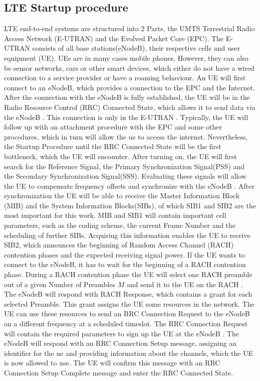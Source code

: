 \documentclass[conference]{IEEEtran}
\begin{document}
\subsection{LTE Startup procedure}
LTE end-to-end systems are structured into 2 Parts, the UMTS Terrestrial Radio Access Network (E-UTRAN) and the Evolved Packet Core (EPC).
The E-UTRAN consists of all base stations(eNodeB), their respective cells and user equipment (UE).
UEs are in many cases mobile phones.
However, they can also be sensor networks, cars or other smart devices, which either do not have a wired connection to a service provider or have a roaming behaviour.
An UE will first connect to an eNodeB, which provides a connection to the EPC and the Internet.
After the connection with the eNodeB is fully established, the UE will be in the Radio Resource Control (RRC) Connected State, which allows it to send data via the eNodeB .
This connection is only in the E-UTRAN .
Typically, the UE will follow up with an attachment procedure with the EPC and some other procedures, which in turn will allow the ue to access the internet.
Nevertheless, the Startup Procedure until the RRC Connected State will be the first bottleneck, which the UE will encounter.
After turning on, the UE will first search for the Reference Signal, the Primary Synchronization Signal(PSS) and the Secondary Synchronization Signal(SSS).
Evaluating these signals will allow the UE to compensate frequency offsets and synchronize with the eNodeB .
After synchronization the UE will be able to receive the Master Information Block (MIB) and the System Information Blocks(SIBs), of which SIB1 and SIB2 are the most important for this work.
MIB and SIB1 will contain important cell parameters, such as the coding scheme, the current Frame Number and the scheduling of further SIBs.
Acquiring this information enables the UE to receive SIB2, which announces the beginning of Random Access Channel (RACH) contention phases and the expected receiving signal power.
If the UE wants to connect to the eNodeB, it has to wait for the beginning of a RACH contention phase.
During a RACH contention phase the UE will select one RACH preamble out of a given Number of Preambles $M$ and send it to the UE on the RACH .
The eNodeB will respond with RACH Response, which contains a grant for each selected Preamble.
This grant assigns the UE some resources in the network.
The UE can use these resources to send an RRC Connection Request to the eNodeB on a different frequency at a scheduled timeslot.
The RRC Connection Request will contain the required parameters to sign up the UE at the eNodeB .
The eNodeB will respond with an RRC Connection Setup message, assigning an identifier for the ue and providing information about the channels, which the UE is now allowed to use.
The UE will confirm this message with an RRC Connection Setup Complete message and enter the RRC Connected State. 
\end{document}
